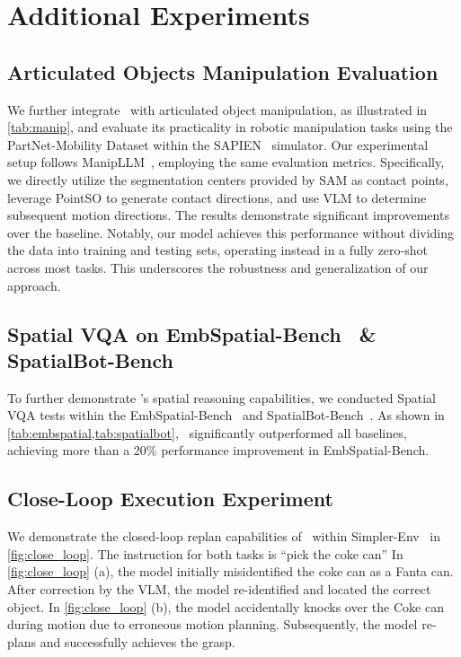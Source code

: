 \section{Additional Experiments}\label{app:add_exp}

\subsection{Articulated Objects Manipulation Evaluation}
We further integrate \ours~with articulated object manipulation, as illustrated in \cref{tab:manip}, and evaluate its practicality in robotic manipulation tasks using the PartNet-Mobility Dataset within the SAPIEN~\cite{SAPIEN20} simulator. Our experimental setup follows ManipLLM~\cite{ManipLLM24}, employing the same evaluation metrics. Specifically, we directly utilize the segmentation centers provided by SAM as contact points, leverage PointSO to generate contact directions, and use VLM to determine subsequent motion directions. The results demonstrate significant improvements over the baseline. Notably, our model achieves this performance without dividing the data into training and testing sets, operating instead in a fully zero-shot across most tasks. This underscores the robustness and generalization of our approach.



\subsection{Spatial VQA on EmbSpatial-Bench~\cite{embspatial24} \& SpatialBot-Bench~\cite{SpatialBot24}}
To further demonstrate \sofar's spatial reasoning capabilities, we conducted Spatial VQA tests within the EmbSpatial-Bench~\cite{embspatial24} and SpatialBot-Bench~\cite{SpatialBot24}. As shown in \cref{tab:embspatial,tab:spatialbot}, \sofar~significantly outperformed all baselines, achieving more than a 20\% performance improvement in EmbSpatial-Bench.




\subsection{Close-Loop Execution Experiment}\label{app:close_loop}
We demonstrate the closed-loop replan capabilities of \sofar~within Simpler-Env~\cite{simplerenv24} in \cref{fig:close_loop}. The instruction for both tasks is ``pick the coke can'' In \cref{fig:close_loop} (a), the model initially misidentified the coke can as a Fanta can. After correction by the VLM, the model re-identified and located the correct object. In \cref{fig:close_loop} (b), the model accidentally knocks over the Coke can during motion due to erroneous motion planning. Subsequently, the model re-plans and successfully achieves the grasp.

